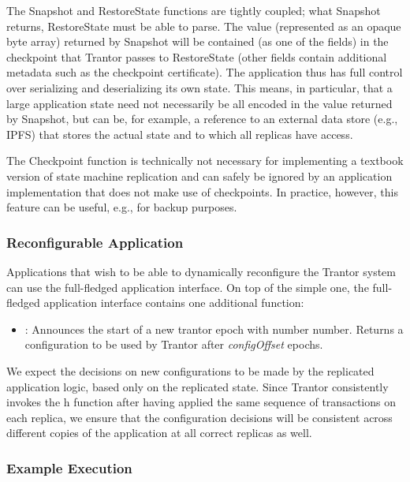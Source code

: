 \documentclass{article}
\begin{document}
The Snapshot and RestoreState functions are tightly coupled; what Snapshot returns, RestoreState must be able to parse.
The  value (represented as an opaque byte array) returned by Snapshot
will be contained (as one of the fields) in the checkpoint that Trantor passes to RestoreState
(other fields contain additional metadata such as the checkpoint certificate).
The application thus has full control over serializing and deserializing its own state.
This means, in particular, that a large application state need not necessarily be all encoded in the value returned by Snapshot,
but can be, for example, a reference to an external data store (e.g., IPFS) that stores the actual state and to which all replicas have access.

The Checkpoint function is technically not necessary for implementing a textbook version of state machine replication
and can safely be ignored by an application implementation that does not make use of checkpoints.
In practice, however, this feature can be useful, e.g., for backup purposes.

\subsubsection{Reconfigurable Application}

Applications that wish to be able to dynamically reconfigure the Trantor system can use the full-fledged application interface.
On top of the simple one, the full-fledged application interface contains one additional function:
\begin{itemize}
    \item {}: Announces the start of a new trantor epoch with number number.
    Returns a configuration to be used by Trantor after \textit{configOffset} epochs.
\end{itemize}

We expect the decisions on new configurations to be made by the replicated application logic, based only on the replicated state.
Since Trantor consistently invokes the h function after having applied the same sequence of transactions on each replica,
we ensure that the configuration decisions will be consistent across different copies of the application at all correct replicas as well.

\subsubsection{Example Execution}
\end{document}

